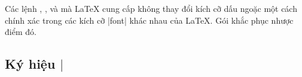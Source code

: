 \medskip
Các lệnh , ,  và  mà \LaTeX{} cung cấp
không thay đổi kích cỡ dấu ngoặc một cách chính xác trong các kích cỡ |font|
khác nhau của \LaTeX{}. Gói  khắc phục nhược điểm đó.

\subsection{Ký hiệu $\rvert$}

